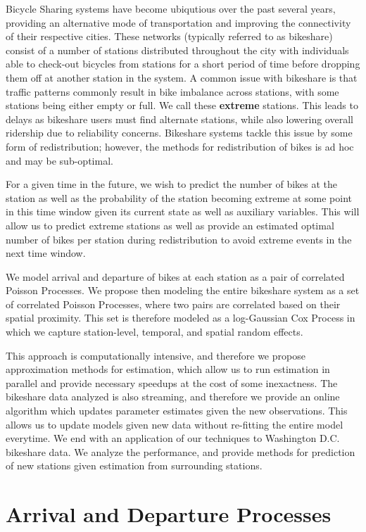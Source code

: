\documentclass{acm_proc_article-sp}
\begin{document}
Bicycle Sharing systems have become ubiqutious over the past several years, providing an alternative mode of transportation and improving the connectivity of their respective cities.  These networks (typically referred to as bikeshare) consist of a number of stations distributed throughout the city with individuals able to check-out bicycles from stations for a short period of time before dropping them off at another station in the system.  A common issue with bikeshare is that traffic patterns commonly result in bike imbalance across stations, with some stations being either empty or full.  We call these {\bf extreme} stations.  This leads to delays as bikeshare users must find alternate stations, while also lowering overall ridership due to reliability concerns. Bikeshare systems tackle this issue by some form of redistribution; however, the methods for redistribution of bikes is ad hoc and may be sub-optimal.

For a given time in the future, we wish to predict the number of bikes at the station as well as the probability of the station becoming extreme at some point in this time window given its current state as well as auxiliary variables.  This will allow us to predict extreme stations as well as provide an estimated optimal number of bikes per station during redistribution to avoid extreme events in the next time window.

We model arrival and departure of bikes at each station as a pair of correlated Poisson Processes.  We propose then modeling the entire bikeshare system as a set of correlated Poisson Processes, where two pairs are correlated based on their spatial proximity.  This set is therefore modeled as a log-Gaussian Cox Process in which we capture station-level, temporal, and spatial random effects.  

This approach is computationally intensive, and therefore we propose approximation methods for estimation, which allow us to run estimation in parallel and provide necessary speedups at the cost of some inexactness.  The bikeshare data analyzed is also streaming, and therefore we provide an online algorithm which updates parameter estimates given the new observations.  This allows us to update models given new data without re-fitting the entire model everytime.  We end with an application of our techniques to Washington D.C. bikeshare data.  We analyze the performance, and provide methods for prediction of new stations given estimation from surrounding stations.


\section{Arrival and Departure Processes}
\end{document}
